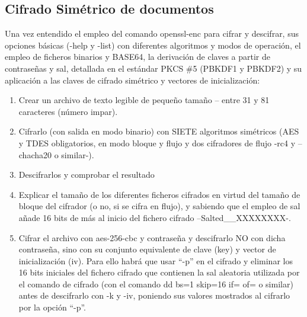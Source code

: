 \subsection{Cifrado Simétrico de documentos}
Una vez entendido el empleo del comando openssl-enc para cifrar y descifrar, sus opciones básicas
(-help y -list) con diferentes algoritmos y modos de operación, el empleo de 
ficheros binarios y BASE64, la derivación de claves a partir de contraseñas 
y sal, detallada en el estándar PKCS \#5 (PBKDF1 y PBKDF2) y su aplicación a 
las claves de cifrado simétrico y vectores de inicialización:
\begin{enumerate}
    \item Crear un archivo de texto legible de pequeño tamaño – entre 31 y 81 caracteres (número impar).
    \item Cifrarlo (con salida en modo binario) con SIETE algoritmos simétricos (AES y TDES
    obligatorios, en modo bloque y flujo y dos cifradores de flujo -rc4 y –chacha20 o similar-).
    \item Descifrarlos y comprobar el resultado
    \item Explicar el tamaño de los diferentes ficheros cifrados en virtud del tamaño de bloque del cifrador
    (o no, si se cifra en flujo), y sabiendo que el empleo de sal añade 16 bits de más al inicio del
    fichero cifrado –Salted\_\_XXXXXXXX-.
    \item Cifrar el archivo con aes-256-cbc y contraseña y 
    descifrarlo NO con dicha contraseña, sino con su conjunto 
    equivalente de clave (key) y vector de inicialización (iv). 
    Para ello habrá que usar “-p” en el cifrado y eliminar los 16 
    bits iniciales del fichero cifrado que contienen la sal aleatoria 
    utilizada por el comando de cifrado (con el comando dd bs=1 skip=16 if= of= o 
    similar) antes de descifrarlo con -k y -iv, poniendo sus valores 
    mostrados al cifrarlo por la opción “-p”.
\end{enumerate}

